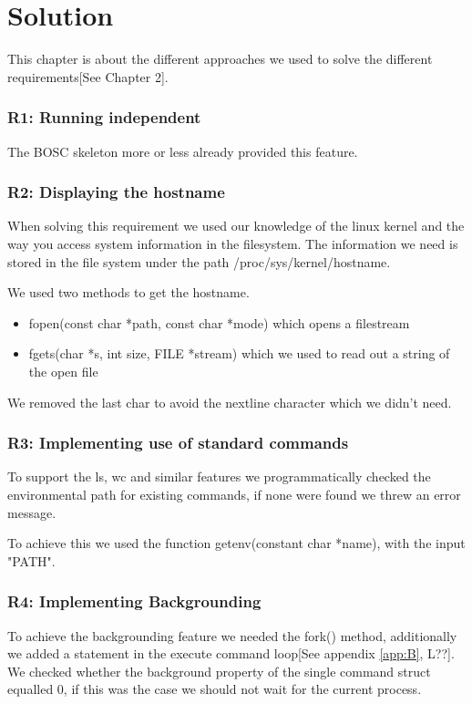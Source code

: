 \chapter{Solution}
This chapter is about the different approaches we used to solve the different requirements[See Chapter 2].
\subsection{R1: Running independent}
The BOSC skeleton more or less already provided this feature.

\subsection{R2: Displaying the hostname}
When solving this requirement we used our knowledge of the linux kernel and the way you access system information in the filesystem. The information we need is stored in the file system under the path /proc/sys/kernel/hostname.

We used two methods to get the hostname.
\begin{itemize}
\item fopen(const char *path, const char *mode) which opens a filestream
\item fgets(char *s, int size, FILE *stream) which we used to read out a string of the open file
\end{itemize}
We removed the last char to avoid the nextline character which we didn't need.

\subsection{R3: Implementing use of standard commands}
To support the ls, wc and similar features we programmatically checked the environmental path for existing commands, if none were found we threw an error message.

To achieve this we used the function getenv(constant char *name), with the input "PATH".

\subsection{R4: Implementing Backgrounding}
To achieve the backgrounding feature we needed the fork() method, additionally we added a statement in the execute command loop[See appendix \ref{app:B}, L??].\\
We checked whether the background property of the single command struct equalled 0, if this was the case we should not wait for the current process.

